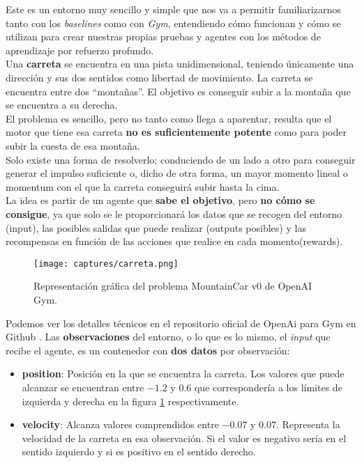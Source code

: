 \documentclass[11pt,fleqn]{book} %
\begin{document}
Este es un entorno muy sencillo y simple que nos va a permitir familiarizarnos tanto con los \textit{baselines} como con \textit{Gym}, entendiendo cómo funcionan y cómo se utilizan para crear nuestras propias pruebas y agentes con los métodos de aprendizaje por refuerzo profundo. \\

Una \textbf{carreta} se encuentra en una pista unidimensional, teniendo únicamente una dirección y sus dos sentidos como libertad de movimiento. La carreta se encuentra entre dos ``montañas''. El objetivo es conseguir subir a la montaña que se encuentra a su derecha. \\

El problema es sencillo, pero no tanto como llega a aparentar, resulta que el motor que tiene esa carreta \textbf{no es suficientemente potente} como para poder subir la cuesta de esa montaña. \\

Solo existe una forma de resolverlo; conduciendo de un lado a otro para conseguir generar el impulso suficiente o, dicho de otra forma, un mayor momento lineal o momentum con el que la carreta conseguirá subir hasta la cima. \\

La idea es partir de un agente que \textbf{sabe el objetivo}, pero \textbf{no cómo se consigue}, ya que solo se le proporcionará los datos que se recogen del entorno (input), las posibles salidas que puede realizar (outputs posibles) y las recompensas en función de las acciones que realice en cada momento(rewards). \\

\begin{figure}[H]
	\centering\texttt{[image: captures/carreta.png]}
	\caption{Representación gráfica del problema MountainCar v0 de OpenAI Gym.}
	\label{fig:carreta} %
\end{figure}

Podemos ver los detalles técnicos en el repositorio oficial de OpenAi para Gym en Github \cite{article:mountain2}. Las \textbf{observaciones} del entorno, o lo que es lo mismo, el \textit{input} que recibe el agente, es un contenedor con \textbf{dos datos} por observación: \\

\begin{itemize}
	\item \textbf{position}: Posición en la que se encuentra la carreta. Los valores que puede alcanzar se encuentran entre $-1.2$ y $0.6$ que correspondería a los límites de izquierda y derecha en la figura \ref{fig:carreta} respectivamente. \\
	
	\item \textbf{velocity}: Alcanza valores comprendidos entre $-0.07$ y $0.07$. Representa la velocidad de la carreta en esa observación. Si el valor es negativo sería en el sentido izquierdo y si es positivo en el sentido derecho. \\
\end{itemize}
\end{document}
